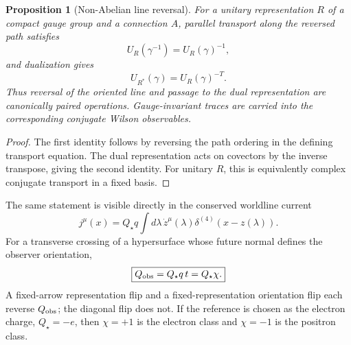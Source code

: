 \documentclass[11pt]{article}
\newtheorem{proposition}[theorem]{Proposition}
\theoremstyle{definition}\newtheorem{definition}[theorem]{Definition}
\theoremstyle{remark}\newtheorem{remark}[theorem]{Remark}\newtheorem{conjecture}[theorem]{Conjecture}
\begin{document}
\begin{proposition}[Non-Abelian line reversal]\label{prop:nonab}
For a unitary representation $R$ of a compact gauge group and a connection $A$, parallel transport along the reversed path satisfies
\begin{equation}
 U_R(\gamma^{-1})=U_R(\gamma)^{-1},
\end{equation}
and dualization gives
\begin{equation}
 U_{R^*}(\gamma)=U_R(\gamma)^{-T}.
\end{equation}
Thus reversal of the oriented line and passage to the dual representation are canonically paired operations. Gauge-invariant traces are carried into the corresponding conjugate Wilson observables.
\end{proposition}
\begin{proof}
The first identity follows by reversing the path ordering in the defining transport equation. The dual representation acts on covectors by the inverse transpose, giving the second identity. For unitary $R$, this is equivalently complex conjugate transport in a fixed basis.
\end{proof}

The same statement is visible directly in the conserved worldline current
\begin{equation}
 j^\mu(x)=Q_\star q\int d\lambda\,\dot z^\mu(\lambda)\delta^{(4)}(x-z(\lambda)).
\end{equation}
For a transverse crossing of a hypersurface whose future normal defines the observer orientation,
\begin{equation}\label{eq:qobs}
 \boxed{Q_{\rm obs}=Q_\star q\,t=Q_\star\chi.}
\end{equation}
A fixed-arrow representation flip and a fixed-representation orientation flip each reverse $Q_{\rm obs}$; the diagonal flip does not. If the reference is chosen as the electron charge, $Q_\star=-e$, then $\chi=+1$ is the electron class and $\chi=-1$ is the positron class.
\end{document}
